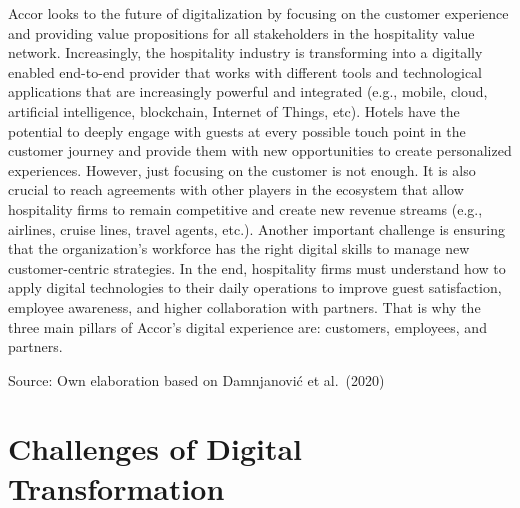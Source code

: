 \documentclass[
  letterpaper,
  DIV=11,
  numbers=noendperiod]{scrreprt}
\begin{document}
\begin{tcolorbox}[enhanced jigsaw, title=\textcolor{quarto-callout-note-color}{\faInfo}\hspace{0.5em}{Accor and Digital Transformation}, colframe=quarto-callout-note-color-frame, arc=.35mm, colbacktitle=quarto-callout-note-color!10!white, rightrule=.15mm, titlerule=0mm, toptitle=1mm, opacitybacktitle=0.6, bottomtitle=1mm, colback=white, leftrule=.75mm, bottomrule=.15mm, breakable, left=2mm, toprule=.15mm, opacityback=0, coltitle=black]

Accor looks to the future of digitalization by focusing on the customer
experience and providing value propositions for all stakeholders in the
hospitality value network. Increasingly, the hospitality industry is
transforming into a digitally enabled end-to-end provider that works
with different tools and technological applications that are
increasingly powerful and integrated (e.g., mobile, cloud, artificial
intelligence, blockchain, Internet of Things, etc). Hotels have the
potential to deeply engage with guests at every possible touch point in
the customer journey and provide them with new opportunities to create
personalized experiences. However, just focusing on the customer is not
enough. It is also crucial to reach agreements with other players in the
ecosystem that allow hospitality firms to remain competitive and create
new revenue streams (e.g., airlines, cruise lines, travel agents, etc.).
Another important challenge is ensuring that the organization's
workforce has the right digital skills to manage new customer-centric
strategies. In the end, hospitality firms must understand how to apply
digital technologies to their daily operations to improve guest
satisfaction, employee awareness, and higher collaboration with
partners. That is why the three main pillars of Accor's digital
experience are: customers, employees, and partners.

Source: Own elaboration based on Damnjanović et al.~(2020)

\end{tcolorbox}

\hypertarget{challenges-of-digital-transformation}{%
\section{Challenges of Digital
Transformation}\label{challenges-of-digital-transformation}}
\end{document}
